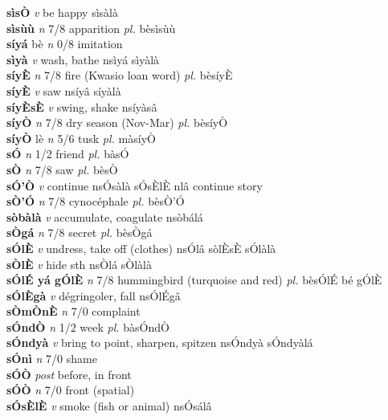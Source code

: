 \documentclass{article}
\begin{document}
{\bf sìsÒ}  {\it v} be happy      sìsàlà   \\ 
{\bf sìsùù}  {\it n} 7/8 apparition {\it pl.} bèsìsùù         \\ 
{\bf síyá} bè {\it n} 0/8 imitation         \\ 
{\bf sìyà}  {\it v} wash, bathe   nsìyá   sìyàlà   \\ 
{\bf síyÈ}  {\it n} 7/8 fire (Kwasio loan word) {\it pl.} bèsíyÈ         \\ 
{\bf síyÈ}  {\it v} saw   nsíyâ   síyàlà   \\ 
{\bf síyÈsÈ}  {\it v} swing, shake   nsíyàsâ      \\ 
{\bf síyÒ}  {\it n} 7/8 dry season (Nov-Mar) {\it pl.} bèsíyÒ         \\ 
{\bf síyÒ} lè {\it n} 5/6 tusk {\it pl.} màsíyÒ         \\ 
{\bf sÓ}  {\it n} 1/2 friend {\it pl.} bàsÓ         \\ 
{\bf sÒ}  {\it n} 7/8 saw {\it pl.} bèsÒ         \\ 
{\bf sÓ'Ò}  {\it v} continue   nsÓsàlà sÓsÈlÈ nlâ continue story     \\ 
{\bf sÒ'Ó}  {\it n} 7/8 cynocéphale {\it pl.} bèsÒ'Ó         \\ 
{\bf sòbàlà}  {\it v} accumulate, coagulate   nsòbálá      \\ 
{\bf sÒgá}  {\it n} 7/8 secret {\it pl.} bèsÒgá         \\ 
{\bf sÓlÈ}  {\it v} undress, take off (clothes)   nsÓlâ  sòlÈsÈ sÓlàlà   \\ 
{\bf sÒlÈ}  {\it v} hide sth   nsÒlá   sÒlàlà   \\ 
{\bf sÓlÉ yá gÓlÈ}  {\it n} 7/8 hummingbird (turquoise and red) {\it pl.} bèsÓlÉ bé gÓlÈ         \\ 
{\bf sÓlÈgà}  {\it v} dégringoler, fall   nsÓlÉgâ      \\ 
{\bf sÒmÒnÈ}  {\it n} 7/0 complaint         \\ 
{\bf sÓndÒ}  {\it n} 1/2 week {\it pl.} bàsÓndÒ         \\ 
{\bf sÓndyà}  {\it v} bring to point, sharpen, spitzen   nsÓndyà   sÓndyàlá   \\ 
{\bf sÓnì}  {\it n} 7/0 shame         \\ 
{\bf sÓÒ}  {\it post} before, in front         \\ 
{\bf sÓÒ}  {\it n} 7/0 front (spatial)         \\ 
{\bf sÓsÈlÈ}  {\it v} smoke (fish or animal)   nsÓsálâ      \\ 
\end{document}
